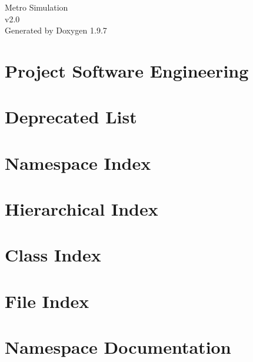 \documentclass[twoside]{book}
\newcommand{\+}{\discretionary{\mbox{\scriptsize$\hookleftarrow$}}{}{}}
\newcommand{\clearemptydoublepage}{%
    \newpage{\pagestyle{empty}\cleardoublepage}%
  }
\begin{document}
  \raggedbottom
    \hypersetup{pageanchor=false,
                bookmarksnumbered=true,
                pdfencoding=unicode
               }
  \begin{titlepage}
  \vspace*{7cm}
  \begin{center}%
  {\Large Metro Simulation}\\
  [1ex]\large v2.\+0 \\
  \vspace*{1cm}
  {\large Generated by Doxygen 1.9.7}\\
  \end{center}
  \end{titlepage}
  \clearemptydoublepage
  \tableofcontents
  \clearemptydoublepage
  \hypersetup{pageanchor=true}
\chapter{Project Software Engineering}
\label{index}\hypertarget{index}{}
\chapter{Deprecated List}
\label{deprecated}

\chapter{Namespace Index}

\chapter{Hierarchical Index}

\chapter{Class Index}

\chapter{File Index}

\chapter{Namespace Documentation}

\end{document}

